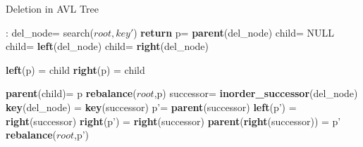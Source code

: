 \documentclass[MTech]{iitmdiss}
\begin{document}
\begin{algorithm}
\caption{Deletion in AVL Tree}
\begin{algorithmic}[1]
:
\State del\_node= search($root,key'$)
\State \textbf{return}
\EndIf
\State p= \textbf{parent}(del\_node)
	\State child= NULL
    	\State child= \textbf{left}(del\_node)
    \Else
    	\State child= \textbf{right}(del\_node)
    \EndIf
    
    	\State \textbf{left}(p) = child
    \Else
    	\State \textbf{right}(p) = child
    \EndIf
    
    	\State \textbf{parent}(child)= p
    \EndIf
    \textbf{rebalance}($root$,p)
\Else
	\State successor= \textbf{inorder\_successor}(del\_node)
    \State \textbf{key}(del\_node) = \textbf{key}(successor)
    \State p'= \textbf{parent}(successor) 
    	\State \textbf{left}(p') = \textbf{right}(successor)  
    \Else
    	\State \textbf{right}(p') = \textbf{right}(successor)
    \EndIf
    	\State \textbf{parent}(\textbf{right}(successor)) = p'
    \EndIf
    \textbf{rebalance}($root$,p')
\EndIf
\EndFunction
\end{algorithmic}
\end{algorithm}
\end{document}
